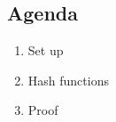 

\subsection{Agenda}
\begin{enumerate}
\item Set up
\item Hash functions
\item Proof
\end{enumerate}
